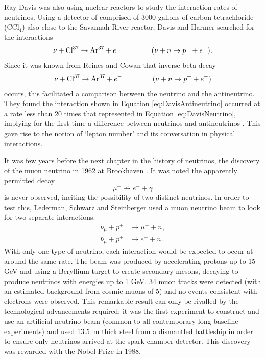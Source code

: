 Ray Davis was also using nuclear reactors to study the interaction rates of neutrinos.  Using a detector of comprised of 3000 gallons of carbon tetrachloride (CCl$_4$) also close to the Savannah River reactor, Davis and Harmer searched for the interactions
\begin{equation}\label{eq:DavisAntineutrino}
  \bar{\nu} + \textnormal{Cl}^{37} \rightarrow \textnormal{Ar}^{37} + e^- \hspace{1.5cm} (\bar{\nu} + n \rightarrow p^+ + e^-).
\end{equation}
Since it was known from Reines and Cowan that inverse beta decay
\begin{equation}\label{eq:DavisNeutrino}
  \nu + \textnormal{Cl}^{37} \rightarrow \textnormal{Ar}^{37} + e^- \hspace{1.5cm} (\nu + n \rightarrow p^+ + e^-)
\end{equation}
occurs, this facilitated a comparison between the neutrino and the antineutrino.  They found the interaction shown in Equation \ref{eq:DavisAntineutrino} occurred at a rate less than 20 times that represented in Equation \ref{eq:DavisNeutrino}, implying for the first time a difference between neutrinos and antineutrinos \cite{Davis1959}.  This gave rise to the notion of `lepton number' and its conversation in physical interactions.

It was few years before the next chapter in the history of neutrinos, the discovery of the muon neutrino in 1962 at Brookhaven \cite{Danby1962}.  It was noted the apparently permitted decay
\begin{equation}
\mu^- \not\rightarrow e^- + \gamma
\end{equation}
is never observed, inciting the possibility of two distinct neutrinos.  In order to test this, Lederman, Schwarz and Steinberger used a muon neutrino beam to look for two separate interactions:
\begin{align}
  \bar{\nu}_{\mu} + p^+ &\rightarrow \mu^+ + n, \\
  \bar{\nu}_{\mu} + p^+ &\rightarrow e^+ + n.
\end{align}
With only one type of neutrino, each interaction would be expected to occur at around the same rate.  The beam was produced by accelerating protons up to 15 GeV and using a Beryllium target to create secondary mesons, decaying to produce neutrinos with energies up to 1 GeV.  34 muon tracks were detected (with an estimated background from cosmic muons of 5) and no events consistent with electrons were observed.  This remarkable result can only be rivalled by the technological advancements required; it was the first experiment to construct and use an artificial neutrino beam (common to all contemporary long-baseline experiments) and used 13.5~m thick steel from a dismantled battleship in order to ensure only neutrinos arrived at the spark chamber detector.  This discovery was rewarded with the Nobel Prize in 1988.

